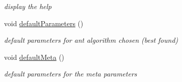\begin{DoxyCompactItemize}
\begin{DoxyCompactList}\small\item\em display the help \end{DoxyCompactList}\item 
void \hyperlink{classUtils_1_1Parameters_a5b564c58c99769f1186849e2590acd37}{default\+Parameters} ()\hypertarget{classUtils_1_1Parameters_a5b564c58c99769f1186849e2590acd37}{}\label{classUtils_1_1Parameters_a5b564c58c99769f1186849e2590acd37}

\begin{DoxyCompactList}\small\item\em default parameters for ant algorithm chosen (best found) \end{DoxyCompactList}\item 
void \hyperlink{classUtils_1_1Parameters_af93a96e1ff6a0b2ffa92132f31a5e803}{default\+Meta} ()\hypertarget{classUtils_1_1Parameters_af93a96e1ff6a0b2ffa92132f31a5e803}{}\label{classUtils_1_1Parameters_af93a96e1ff6a0b2ffa92132f31a5e803}

\begin{DoxyCompactList}\small\item\em default parameters for the meta parameters \end{DoxyCompactList}\end{DoxyCompactItemize}
